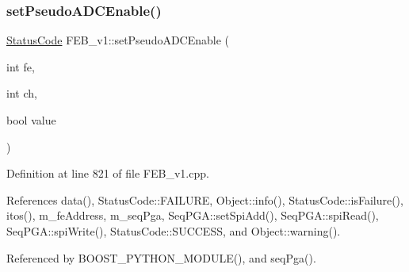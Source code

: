 \subsubsection{\texorpdfstring{set\+Pseudo\+A\+D\+C\+Enable()}{setPseudoADCEnable()}}
{\footnotesize\ttfamily \hyperlink{classStatusCode}{Status\+Code} F\+E\+B\+\_\+v1\+::set\+Pseudo\+A\+D\+C\+Enable (\begin{DoxyParamCaption}\item[{int}]{fe,  }\item[{int}]{ch,  }\item[{bool}]{value }\end{DoxyParamCaption})}



Definition at line 821 of file F\+E\+B\+\_\+v1.\+cpp.



References data(), Status\+Code\+::\+F\+A\+I\+L\+U\+RE, Object\+::info(), Status\+Code\+::is\+Failure(), itos(), m\+\_\+fe\+Address, m\+\_\+seq\+Pga, Seq\+P\+G\+A\+::set\+Spi\+Add(), Seq\+P\+G\+A\+::spi\+Read(), Seq\+P\+G\+A\+::spi\+Write(), Status\+Code\+::\+S\+U\+C\+C\+E\+SS, and Object\+::warning().



Referenced by B\+O\+O\+S\+T\+\_\+\+P\+Y\+T\+H\+O\+N\+\_\+\+M\+O\+D\+U\+L\+E(), and seq\+Pga().


